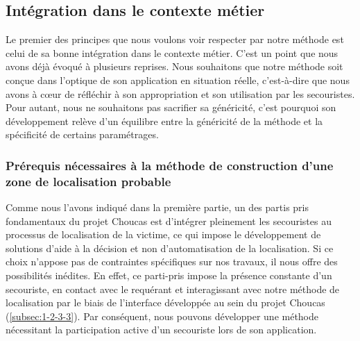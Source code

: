 
\subsection{Intégration dans le contexte métier}

Le premier des principes que nous voulons voir respecter par notre
méthode est celui de sa bonne intégration dans le contexte métier.
%
C'est un point que nous avons déjà évoqué à plusieurs reprises. Nous
souhaitons que notre méthode soit conçue dans l'optique de son
application en situation réelle, c'est-à-dire que nous avons à cœur de
réfléchir à son appropriation et son utilisation par les
secouristes. Pour autant, nous ne souhaitons pas sacrifier sa
généricité, c'est pourquoi son développement relève d'un équilibre
entre la généricité de la méthode et la spécificité de certains
paramétrages.

\subsubsection{Prérequis nécessaires à la méthode de construction
  d'une zone de localisation probable}
\label{sec:4-1-1-1}

Comme nous l'avons indiqué dans la première partie, un des partis pris
fondamentaux du projet Choucas est d'intégrer pleinement les
secouristes au processus de localisation de la victime, ce qui impose
le développement de solutions d'aide à la décision et non
d'automatisation de la localisation. Si ce choix n'appose pas de
contraintes spécifiques sur nos travaux, il nous offre des
possibilités inédites. En effet, ce parti-pris impose la présence
constante d'un secouriste, en contact avec le requérant et
interagissant avec notre méthode de localisation par le biais de
l'interface développée au sein du projet Choucas
(\ref{subsec:1-2-3-3}). Par conséquent, nous pouvons développer une
méthode nécessitant la participation active d'un secouriste lors de
son application.

